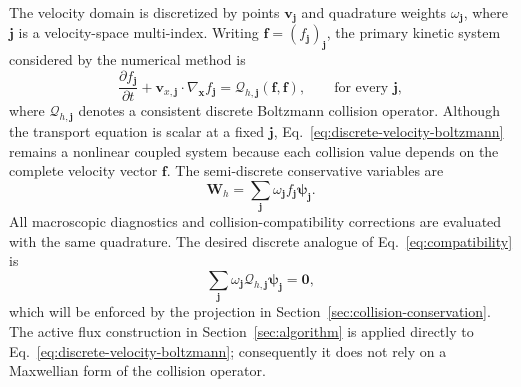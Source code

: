 \documentclass[preprint,3p,12pt]{elsarticle}
\newcommand{\vct}[1]{\boldsymbol{#1}}
\begin{document}
The velocity domain is discretized by points $\vct{v}_{\vct{j}}$ and quadrature weights $\omega_{\vct{j}}$, where $\vct{j}$ is a velocity-space multi-index. Writing $\vct{f}=(f_{\vct{j}})_{\vct{j}}$, the primary kinetic system considered by the numerical method is
\begin{equation}
  \frac{\partial f_{\vct{j}}}{\partial t}
  +\vct{v}_{x,\vct{j}}\cdot\nabla_{\vct{x}}f_{\vct{j}}
  =\mathcal{Q}_{h,\vct{j}}(\vct{f},\vct{f}),
  \qquad \text{for every }\vct{j},
  \label{eq:discrete-velocity-boltzmann}
\end{equation}
where $\mathcal{Q}_{h,\vct{j}}$ denotes a consistent discrete Boltzmann collision operator. Although the transport equation is scalar at a fixed $\vct{j}$, Eq.~\eqref{eq:discrete-velocity-boltzmann} remains a nonlinear coupled system because each collision value depends on the complete velocity vector $\vct{f}$. The semi-discrete conservative variables are
\begin{equation}
  \vct{W}_h = \sum_{\vct{j}} \omega_{\vct{j}}
  f_{\vct{j}}\vct{\psi}_{\vct{j}}.
  \label{eq:discrete-moments}
\end{equation}
All macroscopic diagnostics and collision-compatibility corrections are evaluated with the same quadrature. The desired discrete analogue of Eq.~\eqref{eq:compatibility} is
\begin{equation}
  \sum_{\vct{j}}\omega_{\vct{j}}
  \mathcal{Q}_{h,\vct{j}}\vct{\psi}_{\vct{j}}=\vct{0},
  \label{eq:discrete-collision-compatibility}
\end{equation}
which will be enforced by the projection in Section~\ref{sec:collision-conservation}. The active flux construction in Section~\ref{sec:algorithm} is applied directly to Eq.~\eqref{eq:discrete-velocity-boltzmann}; consequently it does not rely on a Maxwellian form of the collision operator.
\end{document}
